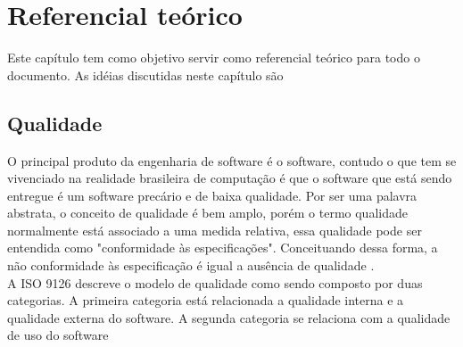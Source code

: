 
\chapter[Referencial Teórico]{Referencial teórico}
	
	Este capítulo tem como objetivo servir como referencial teórico para todo o documento. As idéias discutidas neste capítulo são
	
\section{Qualidade}
	O principal produto da engenharia de software é o software, contudo o que tem se vivenciado na realidade brasileira de computação é que o software que está sendo entregue é um software precário e de baixa qualidade. Por ser uma palavra abstrata, o conceito de qualidade é bem amplo, porém o termo qualidade normalmente está associado a uma medida relativa, essa qualidade pode ser entendida como "conformidade às especificações". Conceituando dessa forma, a não conformidade às especificação é igual a ausência de qualidade \cite{Paduelli}.
\\ A ISO 9126 descreve o modelo de qualidade como sendo composto por duas categorias. A primeira categoria está relacionada a qualidade interna e a qualidade externa do software. A segunda categoria se relaciona com a qualidade de uso do software \cite{_nbr_2016}
 